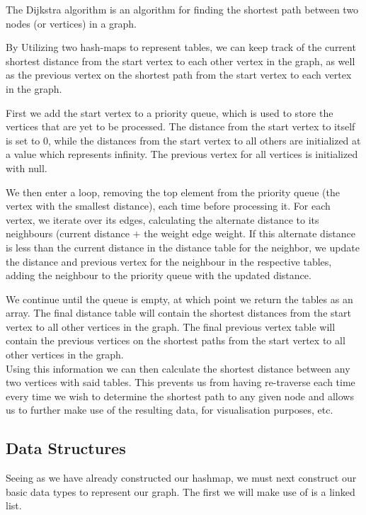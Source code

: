 \documentclass[a4paper]{article}
\begin{document}
The Dijkstra algorithm is an algorithm for finding the shortest path between two nodes (or vertices) in a graph.

By Utilizing two hash-maps to represent tables, we can
keep track of the current shortest distance from the start vertex to each other vertex in the graph,
as well as the previous vertex on the shortest path from the start vertex to each vertex in the graph.

First we add the start vertex to a priority queue,
which is used to store the vertices that are yet to be processed. 
The distance from the start vertex to itself is set to 0, 
while the distances from the start vertex to all others are initialized at a value which represents infinity. 
The previous vertex for all vertices is initialized with null.

We then enter a loop, removing the top element from the priority queue
(the vertex with the smallest distance), each time before processing it. 
For each vertex, we iterate over its edges, calculating the alternate distance to its neighbours 
(current distance $+$ the weight edge weight.
If this alternate distance is less than the current distance in the distance table for the neighbor, 
we update the distance and previous vertex for the neighbour in the respective tables, adding
the neighbour to the priority queue with the updated distance.

We continue until the queue is empty,
at which point we return the tables as an array. 
The final distance table will contain the shortest distances from the start vertex to all other vertices in the graph.
The final previous vertex table will contain the previous vertices on the shortest paths from the start vertex to all other vertices in the graph. \\

Using this information we can then calculate the shortest distance between any two vertices with said tables. 
This prevents us from having re-traverse each time every time we wish to determine the shortest path to any given node 
and allows us to further make use of the resulting data, for visualisation purposes, etc.



\subsection{Data Structures}

Seeing as we have already constructed our hashmap, we must next construct our basic data types 
to represent our graph. The first we will make use of is a linked list. \\
\end{document}
